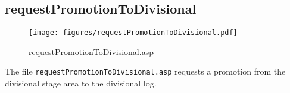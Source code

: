 \subsection{requestPromotionToDivisional}
\begin{figure}[htb]
    \begin{center}
        \texttt{[image: figures/requestPromotionToDivisional.pdf]}
    \end{center}
    \caption{requestPromotionToDivisional.asp}
    \label{fig:requestPromotionToDivisional}
\end{figure}

The file \verb|requestPromotionToDivisional.asp| requests a promotion from the
divisional stage area to the divisional log.
